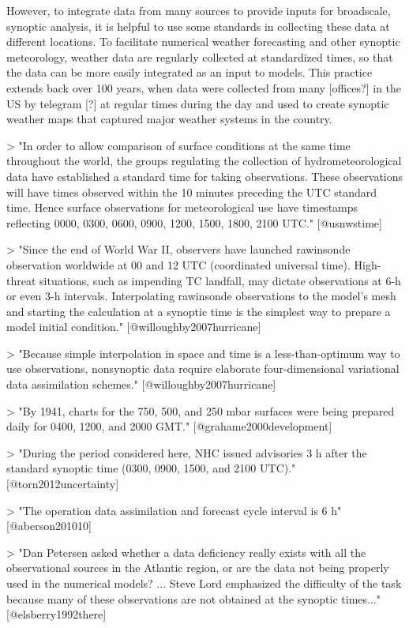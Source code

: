 However, to integrate data from many sources to provide inputs for broadscale,
synoptic analysis, it is helpful to use some standards in collecting these data
at different locations. To facilitate numerical weather forecasting and other
synoptic meteorology, weather data are regularly collected at standardized
times, so that the data can be more easily integrated as an input to models.
This practice extends back over 100 years, when data were collected from many
[offices?] in the US by telegram [?] at regular times during the day and used to
create synoptic weather maps that captured major weather systems in the country.

> "In order to allow comparison of surface conditions at the same time
throughout the world, the groups regulating the collection of
hydrometeorological data have established a standard time for taking
observations. These observations will have times observed within the 10 minutes
preceding the UTC standard time. Hence surface observations for meteorological
use have timestamps reflecting 0000, 0300, 0600, 0900, 1200, 1500, 1800, 2100
UTC." [@usnwstime]

> "Since the end of World War II, observers have launched rawinsonde observation
worldwide at 00 and 12 UTC (coordinated universal time). High-threat situations,
such as impending TC landfall, may dictate observations at 6-h or even 3-h
intervals. Interpolating rawinsonde observations to the model's mesh and
starting the calculation at a synoptic time is the simplest way to prepare a
model initial condition." [@willoughby2007hurricane]

> "Because simple interpolation in space and time is a less-than-optimum way to
use observations, nonsynoptic data require elaborate four-dimensional
variational data assimilation schemes." [@willoughby2007hurricane]

> "By 1941, charts for the 750, 500, and 250 mbar surfaces were being prepared
daily for 0400, 1200, and 2000 GMT." [@grahame2000development]

> "During the period considered here, NHC issued advisories 3 h after the
standard synoptic time (0300, 0900, 1500, and 2100 UTC)." [@torn2012uncertainty]

> "The operation data assimilation and forecast cycle interval is 6 h"
[@aberson201010]

> "Dan Petersen asked whether a data deficiency really exists with all the
observational sources in the Atlantic region, or are the data not being properly
used in the numerical models? ... Steve Lord emphasized the difficulty of the
task because many of these observations are not obtained at the synoptic
times..." [@elsberry1992there]

